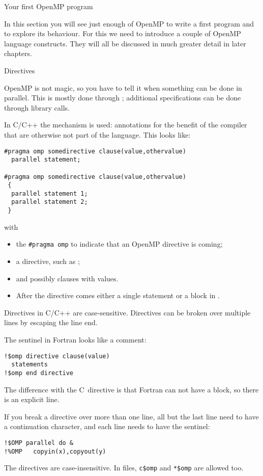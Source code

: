 
 {Your first OpenMP program}

In this section you will see just enough of OpenMP to write a first
program and to explore its behaviour. For this we need to introduce a
couple of OpenMP language constructs. They will all be discussed in
much greater detail in later chapters.

 {Directives}
\label{sec:omp-directives}

OpenMP is not magic, so you have to tell it when something
can be done in parallel. This is mostly done through ;
additional specifications can be done through library calls.

In C/C++ the  mechanism is used: annotations for
the benefit of the compiler that are otherwise not part of the
language. This looks like:
\begin{lstlisting}
#pragma omp somedirective clause(value,othervalue)
  parallel statement;

#pragma omp somedirective clause(value,othervalue)
 {
  parallel statement 1;
  parallel statement 2;
 }
\end{lstlisting}
with
\begin{itemize}
\item the \verb+#pragma omp+  to indicate that
  an OpenMP directive is coming;
\item a directive, such as ;
\item and possibly clauses with values.
\item After the directive comes either a single statement or a block
  in .
\end{itemize}
Directives in C/C++ are case-sensitive. Directives can be broken over
multiple lines by escaping the line end.

The sentinel in Fortran looks like a comment:
\begin{lstlisting}
!$omp directive clause(value)
  statements
!$omp end directive
\end{lstlisting}
The difference with the C~directive is that
Fortran can not have a block, so there is an explicit
 line.

If you break a directive over more than one line, all but the last line
need to have a continuation character, and each line needs to have the sentinel:
\begin{lstlisting}
!$OMP parallel do &
!%OMP   copyin(x),copyout(y)
\end{lstlisting}
The directives are case-insensitive. In
 files, \verb+c$omp+ and
\verb+*$omp+ are allowed too.

